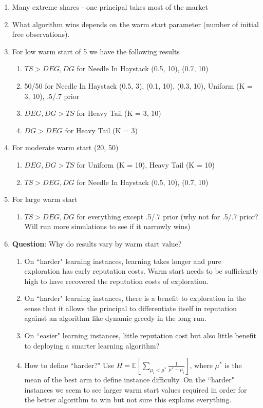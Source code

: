 \documentclass[11pt,letterpaper]{article}
\begin{document}
\begin{enumerate}
\begin{enumerate}
\item Many extreme shares - one principal takes most of the market
\item What algorithm wins depends on the warm start parameter (number of initial free observations). 
\item For low warm start of 5 we have the following results
\begin{enumerate}
\item $TS > DEG, DG$ for Needle In Haystack (0.5, 10), (0.7, 10)
\item 50/50 for Needle In Haystack (0.5, 3), (0.1, 10), (0.3, 10),  Uniform (K = 3, 10), .5/.7 prior
\item $DEG, DG > TS$ for Heavy Tail (K = 3, 10)
\item $DG > DEG$ for Heavy Tail (K = 3)
\end{enumerate}
\item For moderate warm start (20, 50)
\begin{enumerate}
\item $DEG, DG > TS$ for Uniform (K = 10), Heavy Tail (K = 10)
\item $TS > DEG, DG$ for Needle In Haystack (0.5, 10), (0.7, 10)
\end{enumerate}
\item For large warm start
\begin{enumerate}
\item $TS > DEG, DG$ for everything except .5/.7 prior (why not for .5/.7 prior? Will run more simulations to see if it narrowly wins)
\end{enumerate}
\item \textbf{Question}: Why do results vary by warm start value?
\begin{enumerate}
\item On ``harder" learning instances, learning takes longer and pure exploration has early reputation costs. Warm start needs to be sufficiently high to have recovered the reputation costs of exploration.
\item On ``harder" learning instances, there is a benefit to exploration in the sense that it allows the principal to differentiate itself in reputation against an algorithm like dynamic greedy in the long run.
\item On ``easier" learning instances, little reputation cost but also little benefit to deploying a smarter learning algorithm?
\item How to define ``harder?" Use  $H = \mathbb{E}[\sum\limits_{\mu_{i} < \mu^{*}} \frac{1}{\mu^{*} - \mu_{i}}]$, where $\mu^{*}$ is the mean of the best arm to define instance difficulty. On the ``harder" instances we seem to see larger warm start values required in order for the better algorithm to win but not sure this explains everything.
\end{enumerate}
\end{enumerate}


\end{enumerate}
\end{document}
